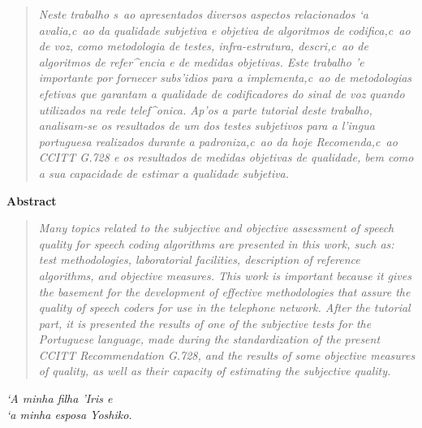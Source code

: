 \begin{quote}
\em
	Neste trabalho s~ao apresentados diversos aspectos relacionados
	`a avalia,c~ao da qualidade subjetiva e objetiva de algoritmos
	de codifica,c~ao de voz, como metodologia de testes,
	infra-estrutura, descri,c~ao de algoritmos de refer^encia e de
	medidas objetivas. Este trabalho 'e importante por fornecer
	subs'idios para a implementa,c~ao de metodologias efetivas que
	garantam a qualidade de codificadores do sinal de voz quando
	utilizados na rede telef^onica. Ap'os a parte tutorial deste
	trabalho, analisam-se os resultados de um dos testes subjetivos
	para a l'ingua portuguesa realizados durante a padroniza,c~ao
	da hoje Recomenda,c~ao CCITT G.728 e os resultados de medidas
	objetivas de qualidade, bem como a sua capacidade de estimar a
	qualidade subjetiva.

\end{quote}

\newpage
\thispagestyle{empty}

\begin{center}
		\bf Abstract
\end{center}


\begin{quote}
\em
	Many topics related to the subjective and objective assessment
	of speech quality for speech coding algorithms are presented in
	this work, such as: test methodologies, laboratorial
	facilities, description of reference algorithms, and objective
	measures. This work is important because it gives the basement
	for the development of effective methodologies that assure the
	quality of speech coders for use in the telephone network.
	After the tutorial part, it is presented the results of one of
	the subjective tests for the Portuguese language, made during
	the standardization of the present CCITT Recommendation G.728,
	and the results of some objective measures of quality, as well
	as their capacity of estimating the subjective quality.

\end{quote}

\newpage
\thispagestyle{empty}


\begin{flushright}
	\em `A minha filha 'Iris e \\ `a minha esposa Yoshiko.
\end{flushright}

